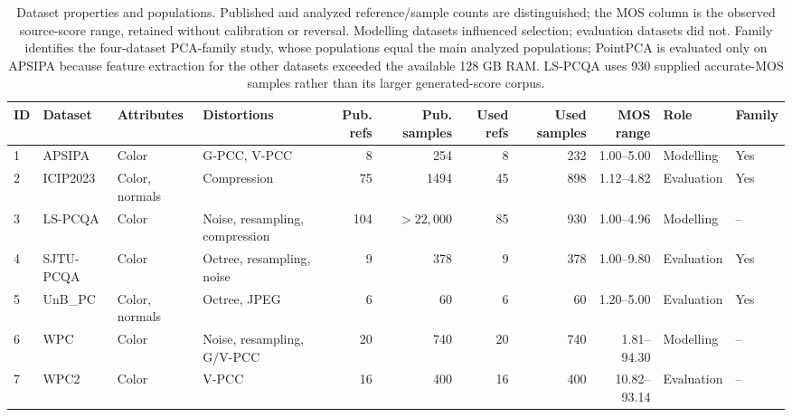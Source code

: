 \begin{table}[t!]
\centering
\caption{Dataset properties and populations. Published and analyzed reference/sample counts are distinguished; the MOS column is the observed source-score range, retained without calibration or reversal. Modelling datasets influenced selection; evaluation datasets did not. Family identifies the four-dataset PCA-family study, whose populations equal the main analyzed populations; PointPCA is evaluated only on APSIPA because feature extraction for the other datasets exceeded the available 128 GB RAM. LS-PCQA uses 930 supplied accurate-MOS samples rather than its larger generated-score corpus.}
\label{tab_datasets}
\scriptsize
\begin{adjustbox}{max width=\textwidth}
\begin{tabular}{llllrrrrrll}
\toprule
ID & Dataset & Attributes & Distortions & Pub. refs & Pub. samples & Used refs & Used samples & MOS range & Role & Family \\
\midrule
1 & APSIPA \cite{apsipa_dataset} & Color & G-PCC, V-PCC & 8 & 254 & 8 & 232 & 1.00--5.00 & Modelling & Yes \\
2 & ICIP2023 \cite{basics_dataset} & Color, normals & Compression & 75 & 1494 & 45 & 898 & 1.12--4.82 & Evaluation & Yes \\
3 & LS-PCQA \cite{liu2023lspcqa} & Color & Noise, resampling, compression & 104 & $>22{,}000$ & 85 & 930 & 1.00--4.96 & Modelling & -- \\
4 & SJTU-PCQA \cite{yang2020predicting} & Color & Octree, resampling, noise & 9 & 378 & 9 & 378 & 1.00--9.80 & Evaluation & Yes \\
5 & UnB\_PC \cite{Torlig2018anovel} & Color, normals & Octree, JPEG & 6 & 60 & 6 & 60 & 1.20--5.00 & Evaluation & Yes \\
6 & WPC \cite{wpc} & Color & Noise, resampling, G/V-PCC & 20 & 740 & 20 & 740 & 1.81--94.30 & Modelling & -- \\
7 & WPC2 \cite{liu2021wpc2} & Color & V-PCC & 16 & 400 & 16 & 400 & 10.82--93.14 & Evaluation & -- \\
\bottomrule
\end{tabular}
\end{adjustbox}
\end{table}
